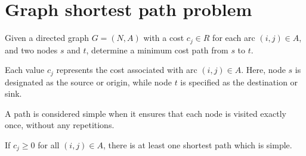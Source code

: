 \section{Graph shortest path problem}

Given a directed graph $G=(N,A)$ with a cost $c_j \in R$ for each arc $(i,j) \in A$, and two nodes $s$ and $t$, determine a minimum cost path from $s$ to $t$. 

Each value $c_j$ represents the cost associated with arc $(i,j) \in A$. 
Here, node $s$ is designated as the source or origin, while node $t$ is specified as the destination or sink.
\begin{definition}
    A path is considered simple when it ensures that each node is visited exactly once, without any repetitions.
\end{definition}
\begin{property}
    If $c_j \geq 0$ for all $(i,j) \in A$, there is at least one shortest path which is simple. 
\end{property}

